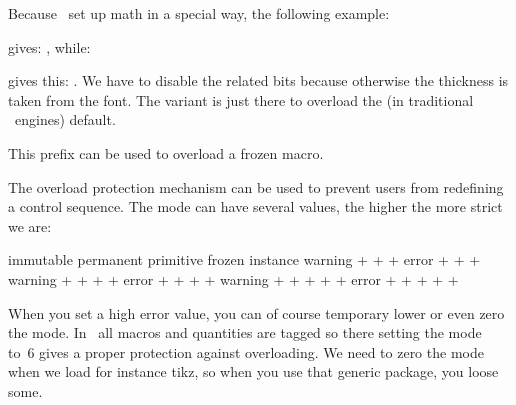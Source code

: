 Because \CONTEXT\ set up math in a special way, the following example:

\startbuffer[demo]
\stopbuffer

\typebuffer[demo]

gives: , while:

\startbuffer[setup]
\mathfontcontrol\zerocount
\Umathoverbarkern{}
\Umathoverbarvgap{}
\Umathoverbarrule{}
\Umathoverlinevariant\textstyle\scriptstyle
\stopbuffer

\typebuffer[setup]

gives this: . We have to disable the related
 bits because otherwise the thickness is taken from the font. The
variant is just there to overload the (in traditional \TEX\ engines) default.

\stopoldprimitive

\startnewprimitive[title={\prm {overloaded}}]

This prefix can be used to overload a frozen macro.

\stopnewprimitive

\startnewprimitive[title={\prm {overloadmode}}]

The overload protection mechanism can be used to prevent users from redefining
a control sequence. The mode can have several values, the higher the more strict
we are:

\starttabulate[||||||||]
    \NC   \NC         \NC immutable \NC permanent \NC primitive \NC frozen \NC instance \NC \NR
     \NC warning \NC +         \NC +         \NC +         \NC        \NC          \NC \NR
     \NC error   \NC +         \NC +         \NC +         \NC        \NC          \NC \NR
     \NC warning \NC +         \NC +         \NC +         \NC +      \NC          \NC \NR
     \NC error   \NC +         \NC +         \NC +         \NC +      \NC          \NC \NR
     \NC warning \NC +         \NC +         \NC +         \NC +      \NC +        \NC \NR
     \NC error   \NC +         \NC +         \NC +         \NC +      \NC +        \NC \NR
\stoptabulate

When you set a high error value, you can of course temporary lower or even zero
the mode. In \CONTEXT\ all macros and quantities are tagged so there setting the
mode to~6 gives a proper protection against overloading. We need to zero the mode
when we load for instance tikz, so when you use that generic package, you loose
some.

